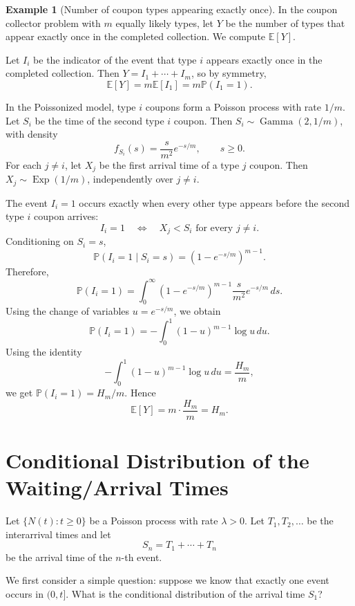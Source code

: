 \documentclass[11pt]{article}
\theoremstyle{plain}
\theoremstyle{definition}
\newtheorem{example}[theorem]{Example}
\theoremstyle{remark}
\begin{document}
	\begin{example}[Number of coupon types appearing exactly once]
		In the coupon collector problem with \(m\) equally likely types, let \(Y\) be the number of types that appear exactly once in the completed collection. We compute \(\mathbb{E}[Y]\).
		
		Let \(I_i\) be the indicator of the event that type \(i\) appears exactly once in the completed collection. Then \(Y=I_1+\cdots+I_m\), so by symmetry,
		\[
		\mathbb{E}[Y]=m\mathbb{E}[I_1]=m\mathbb{P}(I_1=1).
		\]
		
		In the Poissonized model, type \(i\) coupons form a Poisson process with rate \(1/m\). Let \(S_i\) be the time of the second type \(i\) coupon. Then \(S_i\sim\operatorname{Gamma}(2,1/m)\), with density
		\[
		f_{S_i}(s)=\frac{s}{m^2}e^{-s/m},
		\qquad s\ge 0.
		\]
		For each \(j\neq i\), let \(X_j\) be the first arrival time of a type \(j\) coupon. Then \(X_j\sim\operatorname{Exp}(1/m)\), independently over \(j\neq i\).
		
		The event \(I_i=1\) occurs exactly when every other type appears before the second type \(i\) coupon arrives:
		\[
		I_i=1
		\quad\Longleftrightarrow\quad
		X_j<S_i \text{ for every } j\neq i.
		\]
		Conditioning on \(S_i=s\),
		\[
		\mathbb{P}(I_i=1\mid S_i=s)
		=
		(1-e^{-s/m})^{m-1}.
		\]
		Therefore,
		\[
		\mathbb{P}(I_i=1)
		=
		\int_0^\infty
		(1-e^{-s/m})^{m-1}\frac{s}{m^2}e^{-s/m}\,ds.
		\]
		Using the change of variables \(u=e^{-s/m}\), we obtain
		\[
		\mathbb{P}(I_i=1)
		=
		-\int_0^1 (1-u)^{m-1}\log u\,du.
		\]
		Using the identity
		\[
		-\int_0^1 (1-u)^{m-1}\log u\,du
		=
		\frac{H_m}{m},
		\]
		we get \(\mathbb{P}(I_i=1)=H_m/m\). Hence
		\[
		\mathbb{E}[Y]
		=
		m\cdot \frac{H_m}{m}
		=
		H_m.
		\]
	\end{example}
	
	
	

	
	\section{Conditional Distribution of the Waiting/Arrival Times}
	
	Let \(\{N(t):t\ge 0\}\) be a Poisson process with rate \(\lambda>0\). Let \(T_1,T_2,\dots\) be the interarrival times and let
	\[
	S_n=T_1+\cdots+T_n
	\]
	be the arrival time of the \(n\)-th event.
	
	We first consider a simple question: suppose we know that exactly one event occurs in \((0,t]\). What is the conditional distribution of the arrival time \(S_1\)?
	
\end{document}
